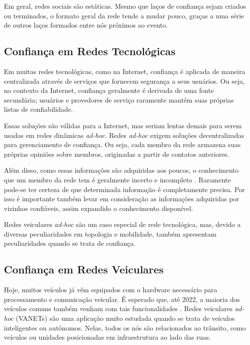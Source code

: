 \begin{resumoextendido}
	Em geral, redes sociais são estáticas.
	Mesmo que laços de confiança sejam criados ou terminados, o formato geral da rede tende a mudar pouco, graças a uma série de outros laços formados entre nós próximos ao evento.
	
	\subsection*{Confiança em Redes Tecnológicas}
	Em muitas redes tecnológicas, como na Internet, confiança é aplicada de maneira centralizada através de serviços que fornecem segurança a seus usuários.
	Ou seja, no contexto da Internet, confiança geralmente é derivada de uma fonte secundária; usuários e provedores de serviço raramente mantêm suas próprias listas de confiabilidade.
	
	Essas soluções são válidas para a Internet, mas seriam lentas demais para serem usadas em redes dinâmicas \textit{ad-hoc}.
	Redes \textit{ad-hoc} exigem soluções decentralizadas para gerenciamento de confiança.
	Ou seja, cada membro da rede armazena suas próprias opiniões sobre membros, originadas a partir de contatos anteriores.
	
	Além disso, como essas informações são adquiridas aos poucos, o conhecimento que um membro da rede tem é geralmente incerto e incompleto \citep{baras2005cooperation}.
	Raramente pode-se ter certeza de que determinada informação é completamente precisa.
	Por isso é importante também levar em consideração as informações adquiridas por vizinhos confiáveis, assim expandido o conhecimento disponível.
	
	Redes veiculares \textit{ad-hoc} são um caso especial de rede tecnológica, mas, devido a diversas peculiaridades em topologia e mobilidade, também apresentam peculiaridades quando se trata de confiança.
	
	\subsection*{Confiança em Redes Veiculares}
	Hoje, muitos veículos já vêm equipados com o hardware necessário para processamento e comunicação veicular.
	É esperado que, até 2022, a maioria dos veículos comuns também venham com tais funcionalidades \citep{connectedcar2016}.
	Redes veiculares \textit{ad-hoc} (VANETs) são uma aplicação muito estudada quando se trata de veículos inteligentes ou autônomos.
	Nelas, todos os nós são relacionados ao trânsito, como veículos ou unidades posicionadas em infraestrutura ao lado das ruas.
	

\end{resumoextendido}
